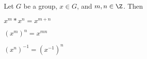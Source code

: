   Let $G$ be a group, $x \in G$, and $m,n \in \Z$.
  Then
  \begin{myenum}
    \item $x^m * x^n = x^{m + n}$ 
    \item $\left( x^{m} \right)^n = x^{mn}$
    \item $(x^n)^{-1} = (x^{-1})^n$  
  \end{myenum}
